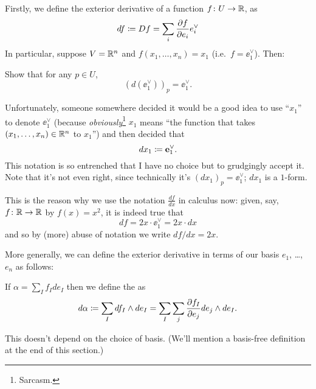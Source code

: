 Firstly, we define the exterior derivative
of a function $f \colon U \to \mathbb R$, as
\[ df \coloneqq Df = \sum_i \frac{\partial f}{\partial e_i} e_i^\vee \]
In particular, suppose $V = \mathbb R^n$ and $f(x_1, \dots, x_n) = x_1$
(i.e.\ $f = \ee_1^\vee$). Then:
\begin{ques}
	Show that for any $p \in U$, \[ \left( d(\ee_1^\vee) \right)_p = \ee_1^\vee. \]
\end{ques}

\begin{abuse}
	Unfortunately, someone somewhere decided
	it would be a good idea to use ``$x_1$'' to denote $\ee_1^\vee$
	(because \emph{obviously}\footnote{Sarcasm.} $x_1$ means
	``the function that takes $(x_1, \dots, x_n) \in \mathbb R^n$ to $x_1$'')
	and then decided that \[ dx_1 \coloneqq \mathbf e_1^\vee. \]
	This notation is so entrenched that I have no choice
	but to grudgingly accept it.
	Note that it's not even right,
	since technically it's $(dx_1)_p = \ee_1^\vee$; $dx_1$ is a $1$-form.
	\label{abuse:dx}
\end{abuse}
\begin{remark}
	This is the reason why we use the notation $\frac{df}{dx}$ in calculus now:
	given, say, $f \colon \mathbb R \to \mathbb R$ by $f(x) = x^2$, it is indeed true that
	\[ df = 2x \cdot \ee_1^\vee = 2x \cdot dx \]
	and so by (more) abuse of notation we write $df/dx = 2x$.
\end{remark}

More generally, we can define the exterior derivative
in terms of our basis $e_1$, \dots, $e_n$ as follows:
\begin{definition}
If $\alpha = \sum_I f_I de_I$ then we define the  as
\[ d\alpha \coloneqq \sum_I df_I \wedge de_I
	= \sum_I \sum_j \frac{\partial f_I}{\partial e_j} de_j \wedge de_I. \]
\end{definition}
This doesn't depend on the choice of basis.
(We'll mention a basis-free definition at the end of this section.)

